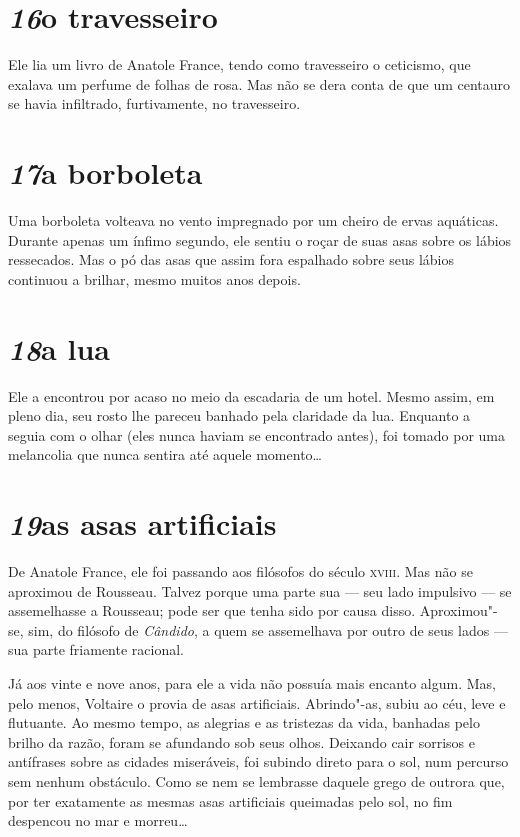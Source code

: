 \section*{\textit{16}\es o travesseiro}

Ele lia um livro de Anatole France, tendo como travesseiro o ceticismo,
que exalava um perfume de folhas de rosa. Mas não se dera conta de que
um centauro se havia infiltrado, furtivamente, no travesseiro.

\section*{\textit{17}\es a borboleta}

Uma borboleta volteava no vento impregnado por um cheiro de ervas
aquáticas. Durante apenas um ínfimo segundo, ele sentiu o roçar de suas
asas sobre os lábios ressecados. Mas o pó das asas que assim fora
espalhado sobre seus lábios continuou a brilhar, mesmo muitos anos
depois.

\section*{\textit{18}\es a lua}

Ele a encontrou por acaso no meio da escadaria de um hotel. Mesmo assim,
em pleno dia, seu rosto lhe pareceu banhado pela claridade da lua.
Enquanto a seguia com o olhar (eles nunca haviam se encontrado antes),
foi tomado por uma melancolia que nunca sentira até aquele momento\ldots{}

\section*{\textit{19}\es as asas artificiais}

De Anatole France, ele foi passando aos filósofos do século \textsc{xviii}. Mas
não se aproximou de Rousseau. Talvez porque uma parte sua --- seu lado
impulsivo --- se assemelhasse a Rousseau; pode ser que tenha sido por
causa disso. Aproximou"-se, sim, do filósofo de \textit{Cândido}, a quem
se assemelhava por outro de seus lados --- sua parte friamente racional.

Já aos vinte e nove anos, para ele a vida não possuía mais encanto
algum. Mas, pelo menos, Voltaire o provia de asas artificiais.
Abrindo"-as, subiu ao céu, leve e flutuante. Ao mesmo tempo, as alegrias
e as tristezas da vida, banhadas pelo brilho da razão, foram se
afundando sob seus olhos. Deixando cair sorrisos e antífrases sobre as
cidades miseráveis, foi subindo direto para o sol, num percurso sem
nenhum obstáculo. Como se nem se lembrasse daquele grego de outrora
que, por ter exatamente as mesmas asas artificiais queimadas pelo sol,
no fim despencou no mar e morreu\ldots{}

